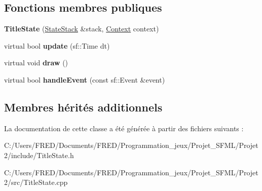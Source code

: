 \subsection*{Fonctions membres publiques}
\begin{DoxyCompactItemize}
\item 
{\bfseries Title\+State} (\hyperlink{class_state_stack}{State\+Stack} \&stack, \hyperlink{struct_state_1_1_context}{Context} context)\hypertarget{class_title_state_a9fb6569d8ed77db85dcf8af2890c112c}{}\label{class_title_state_a9fb6569d8ed77db85dcf8af2890c112c}

\item 
virtual bool {\bfseries update} (sf\+::\+Time dt)\hypertarget{class_title_state_aa282ac0c6e22267cb6a7054973d75fdf}{}\label{class_title_state_aa282ac0c6e22267cb6a7054973d75fdf}

\item 
virtual void {\bfseries draw} ()\hypertarget{class_title_state_ae12beafe5aad6929a56089942de1220e}{}\label{class_title_state_ae12beafe5aad6929a56089942de1220e}

\item 
virtual bool {\bfseries handle\+Event} (const sf\+::\+Event \&event)\hypertarget{class_title_state_a91c6ab4d741fe7445d88ed603001971a}{}\label{class_title_state_a91c6ab4d741fe7445d88ed603001971a}

\end{DoxyCompactItemize}
\subsection*{Membres hérités additionnels}


La documentation de cette classe a été générée à partir des fichiers suivants \+:\begin{DoxyCompactItemize}
\item 
C\+:/\+Users/\+F\+R\+E\+D/\+Documents/\+F\+R\+E\+D/\+Programmation\+\_\+jeux/\+Projet\+\_\+\+S\+F\+M\+L/\+Projet2/include/Title\+State.\+h\item 
C\+:/\+Users/\+F\+R\+E\+D/\+Documents/\+F\+R\+E\+D/\+Programmation\+\_\+jeux/\+Projet\+\_\+\+S\+F\+M\+L/\+Projet2/src/Title\+State.\+cpp\end{DoxyCompactItemize}
